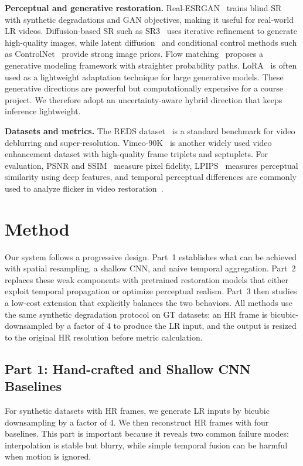 \documentclass[10pt,twocolumn,letterpaper]{article}
\begin{document}
\textbf{Perceptual and generative restoration.}
Real-ESRGAN~\cite{wang2021realesrgan} trains blind SR with synthetic degradations and GAN objectives, making it useful for real-world LR videos. Diffusion-based SR such as SR3~\cite{saharia2022sr3} uses iterative refinement to generate high-quality images, while latent diffusion~\cite{rombach2022ldm} and conditional control methods such as ControlNet~\cite{zhang2023controlnet} provide strong image priors. Flow matching~\cite{lipman2023flowmatching} proposes a generative modeling framework with straighter probability paths. LoRA~\cite{hu2022lora} is often used as a lightweight adaptation technique for large generative models. These generative directions are powerful but computationally expensive for a course project. We therefore adopt an uncertainty-aware hybrid direction that keeps inference lightweight.

\textbf{Datasets and metrics.}
The REDS dataset~\cite{nah2019reds} is a standard benchmark for video deblurring and super-resolution. Vimeo-90K~\cite{xue2019vimeo90k} is another widely used video enhancement dataset with high-quality frame triplets and septuplets. For evaluation, PSNR and SSIM~\cite{wang2004ssim} measure pixel fidelity, LPIPS~\cite{zhang2018lpips} measures perceptual similarity using deep features, and temporal perceptual differences are commonly used to analyze flicker in video restoration~\cite{chu2020tlpips}.

\section{Method}
\label{sec:method}
Our system follows a progressive design. Part~1 establishes what can be achieved with spatial resampling, a shallow CNN, and naive temporal aggregation. Part~2 replaces these weak components with pretrained restoration models that either exploit temporal propagation or optimize perceptual realism. Part~3 then studies a low-cost extension that explicitly balances the two behaviors. All methods use the same synthetic degradation protocol on GT datasets: an HR frame is bicubic-downsampled by a factor of 4 to produce the LR input, and the output is resized to the original HR resolution before metric calculation.

\subsection{Part 1: Hand-crafted and Shallow CNN Baselines}
For synthetic datasets with HR frames, we generate LR inputs by bicubic downsampling by a factor of 4. We then reconstruct HR frames with four baselines. This part is important because it reveals two common failure modes: interpolation is stable but blurry, while simple temporal fusion can be harmful when motion is ignored.
\end{document}
